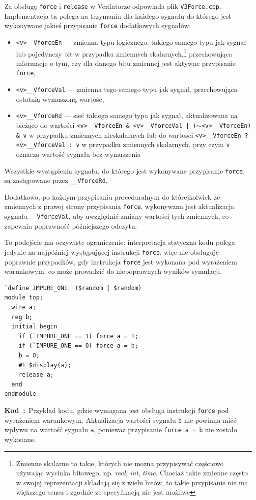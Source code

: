 \documentclass[shortabstract, inz]{iithesis}
\newcounter{kod}[chapter]
\renewcommand{\thekod}{\thechapter\arabic{kod}}
\newcommand{\codecaption}[2]{%
  \par\refstepcounter{kod}\label{#1}%
  \noindent\textbf{Kod~\thekod:}~#2\par
  \vspace*{1.0\baselineskip}%
}
\begin{document}
Za obsługę \texttt{force} i \texttt{release} w Verilatorze odpowiada plik \texttt{V3Force.cpp}. Implementacja ta polega na trzymaniu dla każdego sygnału do którego jest wykonywane jakieś przypisanie \texttt{force} dodatkowych sygnałów:
\begin{itemize}
    \item \texttt{<v>\_\_VforceEn} --- zmienna typu logicznego, takiego samego typu jak sygnał lub pojedynczy bit w przypadku zmiennych skalarnych,\footnote{Zmienne skalarne to takie, których nie można przypisywać częściowo używając wycinka bitowego, np. \textit{real}, \textit{int},  \textit{time}. Chociaż takie zmienne często w swojej reprezentacji składają się z wielu bitów, to takie przypisanie nie ma większego sensu i zgodnie ze specyfikacją nie jest możliwe} przechowująca informację o tym, czy dla danego bitu zmiennej jest aktywne przypisanie \texttt{force},
    \item \texttt{<v>\_\_VforceVal} --- zmienna tego samego typu jak sygnał, przechowująca ostatnią wymuszoną wartość,
    \item \texttt{<v>\_\_VforceRd} --- sieć takiego samego typu jak sygnał, aktualizowana na bieżąco do wartości \texttt{<v>\_\_VforceEn \& <v>\_\_VforceVal | ($\sim$<v>\_\_VforceEn) \& v} w przypadku zmiennych nieskalarnych lub do wartości \texttt{<v>\_\_VforceEn ? <v>\_\_VforceVal : v} w przypadku zmiennych skalarnych, przy czym \texttt{v} oznacza wartość sygnału bez wymuszenia

\end{itemize}
Wszystkie wystąpienia sygnału, do którego jest wykonywane przypisanie \texttt{force}, są zastępowane przez \texttt{\_\_VforceRd}.

Dodatkowo, po każdym przypisaniu proceduralnym do którejkolwiek ze zmiennych z prawej strony przypisania \texttt{force}, wykonywana jest aktualizacja sygnału \texttt{\_\_VforceVal}, aby uwzględnić zmiany wartości tych zmiennych, co zapewnia poprawność późniejszego odczytu.

To podejście ma oczywiste ograniczenie: interpretacja statyczna kodu polega jedynie na najpóźniej występującej instrukcji \texttt{force}, więc nie obsługuje poprawnie przypadków, gdy instrukcja \texttt{force} jest wykonana pod wyrażeniem warunkowym, co może prowadzić do niepoprawnych wyników symulacji.

\begin{verbatim}
`define IMPURE_ONE |($random | $random)
module top;
  wire a;
  reg b;
  initial begin
    if (`IMPURE_ONE == 1) force a = 1;
    if (`IMPURE_ONE == 0) force a = b;
    b = 0;
    #1 $display(a);
    release a;
  end
endmodule
\end{verbatim}
\codecaption{lst:conditional-force}{Przykład kodu, gdzie wymagana jest obsługa instrukcji \texttt{force} pod wyrażeniem warunkowym. Aktualizacja wartości sygnału \texttt{b} nie powinna mieć wpływu na wartość sygnału \texttt{a}, ponieważ przypisanie \texttt{force a = b} nie zostało wykonane.}
\end{document}
